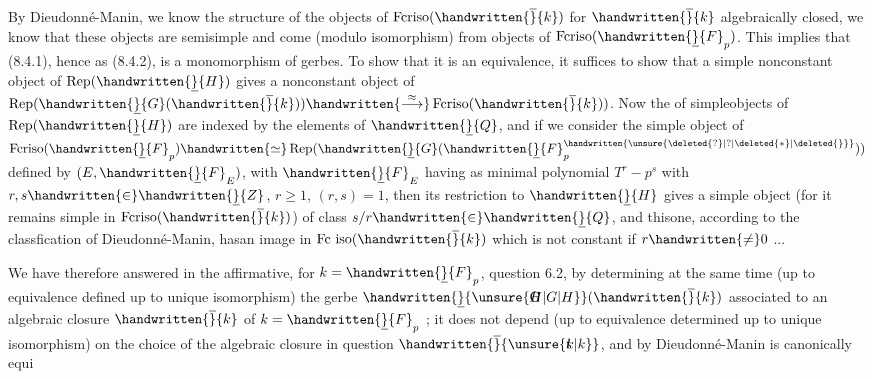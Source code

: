 By Dieudonné-Manin, we know the structure of the objects of $\operatorname{Fcriso}(\handwritten{\overline}{k})$ for $\handwritten{\overline}{k}$ algebraically closed, we know that these objects are semisimple and come (modulo isomorphism) from objects of $\operatorname{Fcriso}(\handwritten{\underline}{F}_p)$. This implies that (8.4.1), hence as (8.4.2), is a monomorphism of gerbes. To show that it is an equivalence, it suffices to show that a simple nonconstant object of  $\operatorname{Rep}(\handwritten{\underline}{H})$ gives a nonconstant object of $\operatorname{Rep}(\handwritten{\underline}{G}(\handwritten{\overline}{k}))\handwritten{\overset{\approx}{\longrightarrow}}\operatorname{Fcriso}(\handwritten{\overline}{k}))$. Now the  of simpleobjects of $\operatorname{Rep}(\handwritten{\underline}{H})$ are indexed by the elements of $\handwritten{\underline}{Q}$, and if we consider the simple object of $\operatorname{Fcriso}(\handwritten{\underline}{F}_p)\handwritten{\simeq}\operatorname{Rep}(\handwritten{\underline}{G}(\handwritten{\underline}{F}_p^{\handwritten{\unsure{\deleted{?}|?|\deleted{*}|\deleted{\overline{\vphantom{F}}}}}}))$ defined by $(E,\handwritten{\underline}{F}_E)$, with $\handwritten{\underline}{F}_E$ having as minimal polynomial $T^r-p^s$ with $r,s\handwritten{\in}\handwritten{\underline}{Z}$, $r\geq1$, $(r,s)=1$, then its restriction to $\handwritten{\underline}{H}$ gives a simple object  (for it remains simple in $\operatorname{Fcriso}(\handwritten{\overline}{k})$) of class $s/r\handwritten{\in}\handwritten{\underline}{Q}$, and this\unsure{\rlap{(}\handwritten{-}|\handwritten{-}}one, according to the classfication of Dieudonné-Manin,  hasan image in $\operatorname{Fc\ iso}(\handwritten{\overline}{k})$ which is not constant if $r\handwritten{\ne}0$ ...

 We have therefore  answered in the affirmative, for $k=\handwritten{\underline}{F}_p$, question 6.2, by determining at the same time (up to equivalence defined up to unique isomorphism) the gerbe $\handwritten{\underline}{\unsure{\rlap{G}H|G|H}}(\handwritten{\overline}{k})$ associated to an algebraic closure $\handwritten{\overline}{k}$ of $k=\handwritten{\underline}{F}_p$ ;  it does not depend (up to  equivalence determined up to unique isomorphism) on the choice of the algebraic closure in question $\handwritten{\overline}{\unsure{\rlap{t}k|k}}$, and by Dieudonné-Manin is canonically equi%

